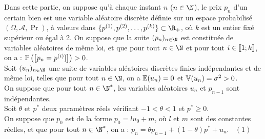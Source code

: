 \documentclass[11pt]{article}%
\begin{document}
\noindent Dans cette partie, on suppose qu'à chaque instant $n$ ($n \in
\N$), le prix $p_{n}$ d'un certain bien est une variable aléatoire
discrète définie sur un espace probabilisé $(\Omega, \mathcal{A},
\Pr)$, à valeurs dans $\{ p^{(1)}, p^{(2)}, \dots, p^{(k)} \} \subset
\R_+ $, où $k$ est un entier fixé supérieur ou égal à 2. On suppose que
la suite $(p_{n})_{n \in \N}$ est constituée de variables aléatoires de
même loi, et que pour tout $n \in \N$ et pour tout $i \in \llbracket 1 ; k
\rrbracket$, on a : $\mathbb{P}\left(\left[ {p_{n} = p^{(i)}]} \right]\right) > 0$. \\
Soit $(u_{n})_{n \in \N}$ une suite de variables aléatoires discrètes
finies indépendantes et de même loi, telles que pour tout $n \in \N$,
on a $\mathbb{E}(u_{n}) = 0$ et $\mathbb{V}(u_{n}) = \sigma^{2} > 0$. \\
On suppose que pour tout $n \in \N^{\ast}$, les variables aléatoires
$u_{n}$ et $p_{n-1}$ sont indépendantes. \\
Soit $\theta$ et $p^{\ast}$ deux paramètres réels vérifiant $-1 <
\theta < 1$ et $p^{\ast} \geq 0$. \\
On suppose que $p_{0}$ est de la forme $p_{0} = l u_{0} + m$, où $l$ et
$m$ sont des constantes réelles, et que pour tout $n \in \N^{\ast}$, on
a : $p_{n} = \theta p_{n-1} + ( 1 - \theta) p^{\ast} + u_{n}. \ \ \ \
(1)$
\end{document}
